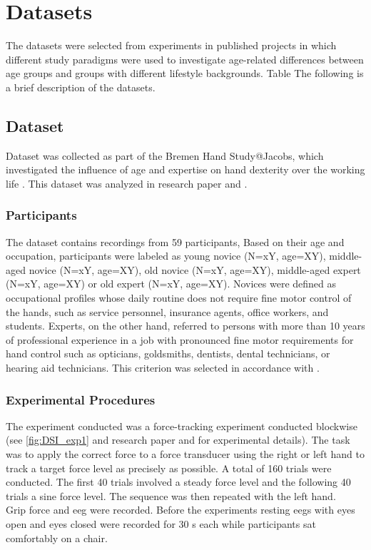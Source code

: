 \section{Datasets}
The datasets were selected from experiments in published projects in which different study paradigms were used to investigate age-related differences between age groups and groups with different lifestyle backgrounds. Table The following is a brief description of the datasets. 

\subsection{Dataset }
\label{methods:datasets:I}
Dataset  was collected as part of the Bremen Hand Study@Jacobs, which investigated the influence of age and expertise on hand dexterity over the working life \cite{Voelcker-Rehage2013}. This dataset was analyzed in research paper  \cite{Goelz2021a} and  \cite{Gaidai2022}.

\subsubsection{Participants}
\label{methods:datasets:I:participants}
The dataset contains recordings from 59 participants, Based on their age and occupation, participants were labeled as young novice (N=xY, age=XY), middle-aged novice (N=xY, age=XY), old novice (N=xY, age=XY), middle-aged expert (N=xY, age=XY) or old expert (N=xY, age=XY). Novices were defined as occupational profiles whose daily routine does not require fine motor control of the hands, such as service personnel, insurance agents, office workers, and students. Experts, on the other hand, referred to persons with more than 10 years of professional experience in a job with pronounced fine motor requirements for hand control such as opticians, goldsmiths, dentists, dental technicians, or hearing aid technicians. This criterion was selected in accordance with \cite{Ericsson1991}. 

\subsubsection{Experimental Procedures}
\label{methods:datasets:I:experiment}
The experiment conducted was a force-tracking experiment conducted blockwise (see \autoref{fig:DSI_exp1} and research paper  and  for experimental details). The task was to apply the correct force to a force transducer using the right or left hand to track a target force level as precisely as possible. A total of 160 trials were conducted. The first 40 trials involved a steady force level and the following 40 trials a sine force level. The sequence was then repeated with the left hand.\\
Grip force and \gls{eeg} were recorded. Before the experiments resting \glspl{eeg} with eyes open and eyes closed were recorded for 30 s each while participants sat comfortably on a chair.

